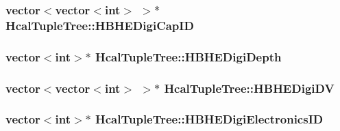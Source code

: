 \subsubsection[{H\+B\+H\+E\+Digi\+Cap\+I\+D}]{\setlength{\rightskip}{0pt plus 5cm}vector$<$vector$<$int$>$ $>$$\ast$ Hcal\+Tuple\+Tree\+::\+H\+B\+H\+E\+Digi\+Cap\+I\+D}\label{class_hcal_tuple_tree_a300d8be67219f5369ac7ce004f95b554}
\hypertarget{class_hcal_tuple_tree_ae5ed39ea705aff8363edefc34423426e}{}
\subsubsection[{H\+B\+H\+E\+Digi\+Depth}]{\setlength{\rightskip}{0pt plus 5cm}vector$<$int$>$$\ast$ Hcal\+Tuple\+Tree\+::\+H\+B\+H\+E\+Digi\+Depth}\label{class_hcal_tuple_tree_ae5ed39ea705aff8363edefc34423426e}
\hypertarget{class_hcal_tuple_tree_a170d23abeaeed048957ada3b4a15f570}{}
\subsubsection[{H\+B\+H\+E\+Digi\+D\+V}]{\setlength{\rightskip}{0pt plus 5cm}vector$<$vector$<$int$>$ $>$$\ast$ Hcal\+Tuple\+Tree\+::\+H\+B\+H\+E\+Digi\+D\+V}\label{class_hcal_tuple_tree_a170d23abeaeed048957ada3b4a15f570}
\hypertarget{class_hcal_tuple_tree_a030e840a1ceb41ce84181c68926aa948}{}
\subsubsection[{H\+B\+H\+E\+Digi\+Electronics\+I\+D}]{\setlength{\rightskip}{0pt plus 5cm}vector$<$int$>$$\ast$ Hcal\+Tuple\+Tree\+::\+H\+B\+H\+E\+Digi\+Electronics\+I\+D}\label{class_hcal_tuple_tree_a030e840a1ceb41ce84181c68926aa948}
\hypertarget{class_hcal_tuple_tree_ae64aeab5ce5b05e5b0e8c140bba901b1}{}
